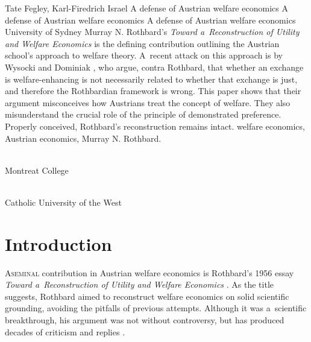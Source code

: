\begin{artengenv2auth}{Tate Fegley, Karl-Firedrich Israel}
	{A defense of Austrian welfare economics}
		{A defense of Austrian welfare economics}
		{A defense of Austrian welfare economics}
	{University of Sydney}
	{Murray N. Rothbard's \textit{Toward a~Reconstruction of Utility and Welfare Economics} is the defining contribution outlining the Austrian school's approach to welfare theory. A~recent attack on this approach is by Wysocki and Dominiak 
	\parencite*[][]{wysocki_how_2023}, %
	 who argue, contra Rothbard, that whether an exchange is welfare-enhancing is not necessarily related to whether that exchange is just, and therefore the Rothbardian framework is wrong. This paper shows that their argument misconceives how Austrians treat the concept of welfare. They also misunderstand the crucial role of the principle of demonstrated preference. Properly conceived, Rothbard's reconstruction remains intact.
		}
		{welfare economics, Austrian economics, Murray N. Rothbard.}
	{%
		{\flushright{}\\\subsubsectit\small{Montreat College}\label{israel-first}\par}%
		{\flushright{}\\\subsubsectit\small{Catholic University of the West}\par}%
	}




\section{Introduction}

\lettrine[loversize=0.13,lines=2,lraise=-0.03,nindent=0em,findent=0.2pt]%
{A}{seminal} %
contribution in Austrian welfare economics is Rothbard's 1956 essay \textit{Toward a~Reconstruction of Utility and Welfare Economics} 
\parencite[][]{rothbard_toward_2011}. %
 As the title suggests, Rothbard aimed to reconstruct welfare economics on solid scientific grounding, avoiding the pitfalls of previous attempts. Although it was a~scientific breakthrough, his argument was not without controversy, but has produced decades of criticism and replies 
\parencites[][]{block_austrian_1999}[][]{caplan_austrian_1999}[][]{cordato_welfare_1992}[][]{gordon_toward_1993}[][]{herbener_pareto_1997}[][]{herbener_defense_2008}[][]{hulsmann_economic_1999}[][]{kvasnicka_rothbards_2008}[][]{prychitko_formalism_1993}.%





\end{artengenv2auth}

